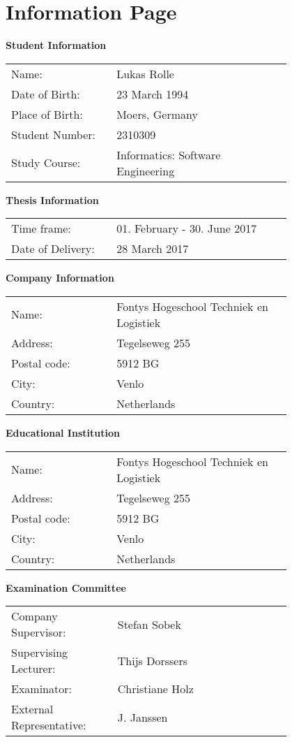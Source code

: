 \chapter*{Information Page}
\textbf{Student Information} \hfill \vspace{0.3cm} \\
\begin{tabular}{p{0.3\linewidth} p{0.5\linewidth}}
	Name: & Lukas Rolle \\
	Date of Birth: & 23 March 1994 \\
	Place of Birth: & Moers, Germany \\
	Student Number: & 2310309 \\
	Study Course: & Informatics: Software Engineering
\end{tabular}

\textbf{Thesis Information} \hfill \vspace{0.3cm} \\
\begin{tabular}{p{0.3\linewidth} p{0.5\linewidth}}
	Time frame: & 01. February - 30. June 2017 \\
	Date of Delivery: & 28 March 2017
\end{tabular}

\textbf{Company Information} \hfill \vspace{0.3cm} \\
\begin{tabular}{p{0.3\linewidth} p{0.5\linewidth}}
	Name: & Fontys Hogeschool Techniek en Logistiek\\
	Address: & Tegelseweg 255\\
	Postal code: & 5912 BG\\
	City: & Venlo \\
	Country: & Netherlands
\end{tabular}

\textbf{Educational Institution} \hfill \vspace{0.3cm} \\
\begin{tabular}{p{0.3\linewidth} p{0.5\linewidth}}
	Name: & Fontys Hogeschool Techniek en Logistiek \\
	Address: & Tegelseweg 255 \\
	Postal code: & 5912 BG \\
	City: & Venlo\\
	Country: & Netherlands 
\end{tabular}

\textbf{Examination Committee} \hfill \vspace{0.3cm} \\
\begin{tabular}{p{0.3\linewidth} p{0.5\linewidth}}
	Company Supervisor: & Stefan Sobek	\\
	Supervising Lecturer: & Thijs Dorssers \\
	Examinator: & Christiane Holz \\
	External Representative:  & J. Janssen
\end{tabular}